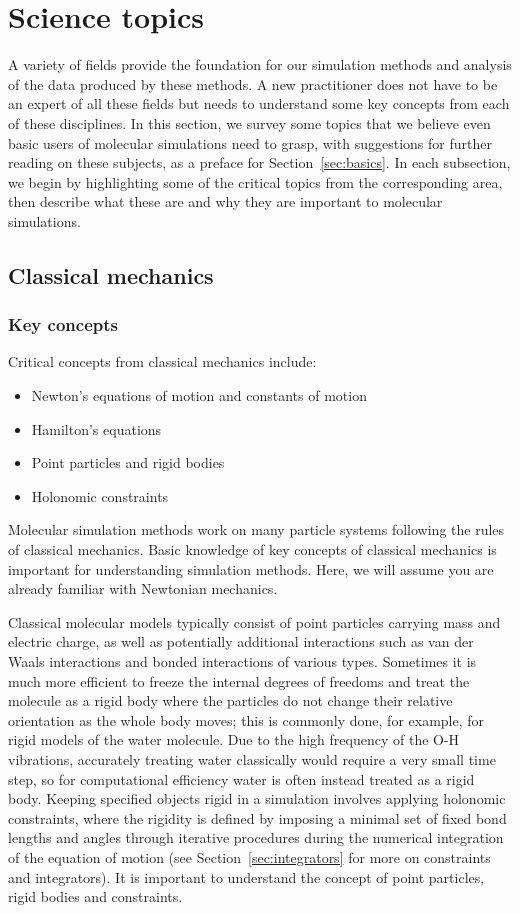\documentclass[9pt,bestpractices]{livecoms}
\begin{document}
\section{Science topics}
\label{sec:science}
A variety of fields provide the foundation for our simulation methods and analysis of the data produced by these methods.
A new practitioner does not have to be an expert of all these fields but needs to understand some key concepts from each of these disciplines.
In this section, we survey some topics that we believe even basic users of molecular simulations need to grasp, with suggestions for further reading on these subjects, as a preface for Section~\ref{sec:basics}.
In each subsection, we begin by highlighting some of the critical topics from the corresponding area, then describe what these are and why they are important to molecular simulations.

\subsection{Classical mechanics}
\label{sec:classical_mechanics}
\subsubsection{Key concepts}

Critical concepts from classical mechanics include:
\begin{itemize}
\item Newton's equations of motion and constants of motion
\item Hamilton's equations
\item Point particles and rigid bodies
\item Holonomic constraints
\end{itemize}

Molecular simulation methods work on many particle systems following the rules of classical mechanics. 
Basic knowledge of key concepts of classical mechanics is important for understanding simulation methods.
Here, we will assume you are already familiar with Newtonian mechanics.

Classical molecular models typically consist of point particles carrying mass and electric charge, as well as potentially additional interactions such as van der Waals interactions and bonded interactions of various types.
Sometimes it is much more efficient to freeze the internal degrees of freedoms and treat the molecule as a rigid body where the particles do not change their relative orientation as the whole body moves; this is commonly done, for example, for rigid models of the water molecule.
Due to the high frequency of the O-H vibrations, accurately treating water classically would require a very small time step, so for computational efficiency water is often instead treated as a rigid body.
Keeping specified objects rigid in a simulation involves applying holonomic constraints, where the rigidity is defined by imposing a minimal set of fixed bond lengths and angles through iterative procedures during the numerical integration of the equation of motion (see Section~\ref{sec:integrators} for more on constraints and integrators).
It is important to understand the concept of point particles, rigid bodies and constraints.
\end{document}
